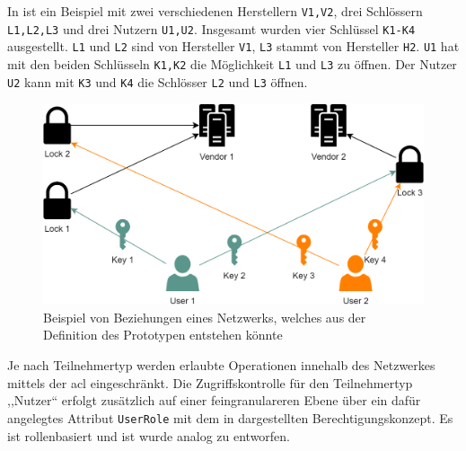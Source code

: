         \noindent In  ist ein Beispiel mit zwei verschiedenen Herstellern \colorbox{light-gray}{\lstinline{V1,V2}}, drei Schlössern \colorbox{light-gray}{\lstinline{L1,L2,L3}} und drei Nutzern \colorbox{light-gray}{\lstinline{U1,U2}}. 
        Insgesamt wurden vier Schlüssel \colorbox{light-gray}{\lstinline{K1-K4}} ausgestellt.
        \colorbox{light-gray}{\lstinline{L1}} und \colorbox{light-gray}{\lstinline{L2}} sind von Hersteller \colorbox{light-gray}{\lstinline{V1}}, \colorbox{light-gray}{\lstinline{L3}} stammt von Hersteller \colorbox{light-gray}{\lstinline{H2}}. 
        \colorbox{light-gray}{\lstinline{U1}} hat mit den beiden Schlüsseln \colorbox{light-gray}{\lstinline{K1,K2}} die Möglichkeit \colorbox{light-gray}{\lstinline{L1}} und \colorbox{light-gray}{\lstinline{L3}} zu öffnen. 
        Der Nutzer \colorbox{light-gray}{\lstinline{U2}} kann mit \colorbox{light-gray}{\lstinline{K3}} und \colorbox{light-gray}{\lstinline{K4}} die Schlösser \colorbox{light-gray}{\lstinline{L2}} und \colorbox{light-gray}{\lstinline{L3}} öffnen.
        \begin{figure}[H]
    		\centering
    		\includegraphics[width=\textwidth]{graphics/pt_network.png}
    		\caption[Beispiel eines von Beziehungen im Prototypen-Netzwerk]{Beispiel von Beziehungen eines Netzwerks, welches aus der Definition des Prototypen entstehen könnte}
    		\label{fig:pt_network}
    	\end{figure}
        \noindent Je nach Teilnehmertyp werden erlaubte Operationen innehalb des Netzwerkes mittels der \gls{acl} eingeschränkt. 
        Die Zugriffskontrolle für den Teilnehmertyp ,,Nutzer`` erfolgt zusätzlich auf einer feingranulareren Ebene über ein dafür angelegtes Attribut \colorbox{light-gray}{\lstinline{UserRole}} mit dem in  dargestellten Berechtigungskonzept. 
        Es ist rollenbasiert und ist wurde analog zu  entworfen. 

